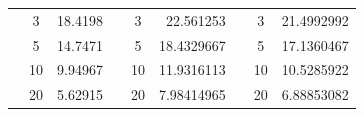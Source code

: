 \begin{table}[]
\begin{tabular}{|ccrccrccr|}
\rowcolor[HTML]{DAE8FC} 
\multicolumn{1}{|c|}{\cellcolor[HTML]{FFFFC7}}                       & \multicolumn{1}{c|}{\cellcolor[HTML]{DAE8FC}3}         & \multicolumn{1}{r|}{\cellcolor[HTML]{DAE8FC}18.4198}    & \multicolumn{1}{c|}{\cellcolor[HTML]{FFFFC7}}                       & \multicolumn{1}{c|}{\cellcolor[HTML]{DAE8FC}3}         & \multicolumn{1}{r|}{\cellcolor[HTML]{DAE8FC}22.561253}  & \multicolumn{1}{c|}{\cellcolor[HTML]{FFFFC7}}                       & \multicolumn{1}{c|}{\cellcolor[HTML]{DAE8FC}3}         & 21.4992992                                              \\ \cline{2-3} \cline{5-6} \cline{8-9} 
\rowcolor[HTML]{DDFDFF} 
\multicolumn{1}{|c|}{\cellcolor[HTML]{FFFFC7}}                       & \multicolumn{1}{c|}{\cellcolor[HTML]{DDFDFF}5}         & \multicolumn{1}{r|}{\cellcolor[HTML]{DDFDFF}14.7471}    & \multicolumn{1}{c|}{\cellcolor[HTML]{FFFFC7}}                       & \multicolumn{1}{c|}{\cellcolor[HTML]{DDFDFF}5}         & \multicolumn{1}{r|}{\cellcolor[HTML]{DDFDFF}18.4329667} & \multicolumn{1}{c|}{\cellcolor[HTML]{FFFFC7}}                       & \multicolumn{1}{c|}{\cellcolor[HTML]{DDFDFF}5}         & 17.1360467                                              \\ \cline{2-3} \cline{5-6} \cline{8-9} 
\rowcolor[HTML]{DAE8FC} 
\multicolumn{1}{|c|}{\cellcolor[HTML]{FFFFC7}}                       & \multicolumn{1}{c|}{\cellcolor[HTML]{DAE8FC}10}        & \multicolumn{1}{r|}{\cellcolor[HTML]{DAE8FC}9.94967}    & \multicolumn{1}{c|}{\cellcolor[HTML]{FFFFC7}}                       & \multicolumn{1}{c|}{\cellcolor[HTML]{DAE8FC}10}        & \multicolumn{1}{r|}{\cellcolor[HTML]{DAE8FC}11.9316113} & \multicolumn{1}{c|}{\cellcolor[HTML]{FFFFC7}}                       & \multicolumn{1}{c|}{\cellcolor[HTML]{DAE8FC}10}        & 10.5285922                                              \\ \cline{2-3} \cline{5-6} \cline{8-9} 
\rowcolor[HTML]{DDFDFF} 
\multicolumn{1}{|c|}{\cellcolor[HTML]{FFFFC7}}                       & \multicolumn{1}{c|}{\cellcolor[HTML]{DDFDFF}20}        & \multicolumn{1}{r|}{\cellcolor[HTML]{DDFDFF}5.62915}    & \multicolumn{1}{c|}{\cellcolor[HTML]{FFFFC7}}                       & \multicolumn{1}{c|}{\cellcolor[HTML]{DDFDFF}20}        & \multicolumn{1}{r|}{\cellcolor[HTML]{DDFDFF}7.98414965} & \multicolumn{1}{c|}{\cellcolor[HTML]{FFFFC7}}                       & \multicolumn{1}{c|}{\cellcolor[HTML]{DDFDFF}20}        & 6.88853082                                              \\ \cline{2-3} \cline{5-6} \cline{8-9} 

\end{tabular}
\end{table}
